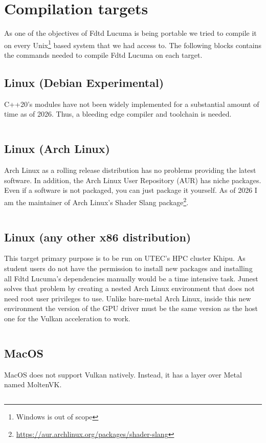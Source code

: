 \documentclass[../../main.tex]{subfiles}
\begin{document}
\chapter{Compilation targets}
As one of the objectives of Fdtd Lucuma is being portable we tried to compile it on every Unix\footnote{Windows is out of scope} based system that we had access to.
The following blocks contains the commands needed to compile Fdtd Lucuma on each target.

\section{Linux (Debian Experimental)}
C++20's modules have not been widely implemented for a substantial amount of time as of 2026.
Thus, a bleeding edge compiler and toolchain is needed.
\inputminted[bgcolor=codeBg, tabsize=4, breaklines=true, linenos=true]{bash}{\subfix{build-debian.sh}}
\section{Linux (Arch Linux)}
Arch Linux as a rolling release distribution has no problems providing the latest software.
In addition, the Arch Linux User Repository (AUR) has niche packages.
Even if a software is not packaged, you can just package it yourself.
As of 2026 I am the maintainer of Arch Linux's Shader Slang package\footnote{\url{https://aur.archlinux.org/packages/shader-slang}}.
\inputminted[bgcolor=codeBg, tabsize=4, breaklines=true, linenos=true]{bash}{\subfix{build-arch.sh}}
\section{Linux (any other x86 distribution)}
This target primary purpose is to be run on UTEC's HPC cluster Khipu.
As student users do not have the permission to install new packages and installing all Fdtd Lucuma's dependencies
manually would be a time intensive task.
Junest\cite{junest} solves that problem by creating a nested Arch Linux environment that does not need root user privileges to use.
Unlike bare-metal Arch Linux, inside this new environment the version of the GPU driver must be the same version as the host one for the Vulkan acceleration to work.
\inputminted[bgcolor=codeBg, tabsize=4, breaklines=true, linenos=true]{bash}{\subfix{build-junest.sh}}
\section{MacOS}
MacOS does not support Vulkan natively.
Instead, it has a layer over Metal named MoltenVK\cite{moltenvk}.
\inputminted[bgcolor=codeBg, tabsize=4, breaklines=true, linenos=true]{bash}{\subfix{build-macos.sh}}
\end{document}
